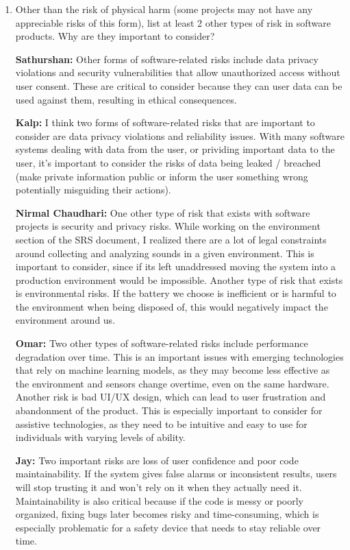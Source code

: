 \documentclass{article}
\begin{document}
\begin{enumerate}
    \item Other than the risk of physical harm (some projects may not have any
    appreciable risks of this form), list at least 2 other types of risk in
    software products. Why are they important to consider?

    \textbf{Sathurshan:} Other forms of software-related risks include data
    privacy violations and security vulnerabilities that allow unauthorized
    access without user consent. These are critical to consider because they can
    user data can be used against them, resulting in ethical consequences.

    \textbf{Kalp:} I think two forms of software-related risks that are 
    important to consider are data privacy violations and reliability issues.
    With many software systems dealing with data from the user, or prividing
    important data to the user, it's important to consider the risks of data 
    being leaked / breached (make private information public or inform the 
    user something wrong potentially misguiding their actions).

    \textbf{Nirmal Chaudhari:} One other type of risk that exists with software 
    projects is security and privacy risks. While working on the environment 
    section of the SRS document, I realized there are a lot of legal constraints
     around collecting and analyzing sounds in a given environment. This is 
     important to consider, since if its left unaddressed moving the system into
      a production environment would be impossible. Another type of risk that 
      exists is environmental risks. If the battery we choose is inefficient or 
      is harmful to the environment when being disposed of, this would 
      negatively impact the environment around us. 

    \textbf{Omar:} Two other types of software-related risks include
    performance degradation over time. This is an important issues with
    emerging technologies that rely on machine learning models, as they may
    become less effective as the environment and sensors change overtime, even
    on the same hardware. Another risk is bad UI/UX design, which can lead to 
    user frustration and abandonment of the product. This is especially
    important to consider for assistive technologies, as they need to be
    intuitive and easy to use for individuals with varying levels of ability.

    \textbf{Jay:} Two important risks are loss of user confidence and poor code 
    maintainability. If the system gives false alarms or inconsistent results, 
    users will stop trusting it and won't rely on it when they actually need it. 
    Maintainability is also critical because if the code is messy or poorly 
    organized, fixing bugs later becomes risky and time-consuming, which is 
    especially problematic for a safety device that needs to stay reliable 
    over time.
\end{enumerate}
\end{document}
